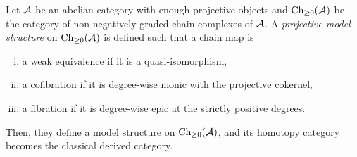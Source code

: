 \documentclass{../../large}
\begin{document}
\begin{prb}
Let $\mathcal{A}$ be an abelian category with enough projective objects and $\mathrm{Ch}_{\ge0}(\mathcal{A})$ be the category of non-negatively graded chain complexes of $\mathcal{A}$.
A \emph{projective model structure} on $\mathrm{Ch}_{\ge0}(\mathcal{A})$ is defined such that a chain map is 
\begin{enumerate}[(i)]
\item a weak equivalence if it is a quasi-isomorphism,
\item a cofibration if it is degree-wise monic with the projective cokernel,
\item a fibration if it is degree-wise epic at the strictly positive degrees.
\end{enumerate}
Then, they define a model structure on $\mathrm{Ch}_{\ge0}(\mathcal{A})$, and its homotopy category becomes the classical derived category.
\end{prb}
\end{document}
